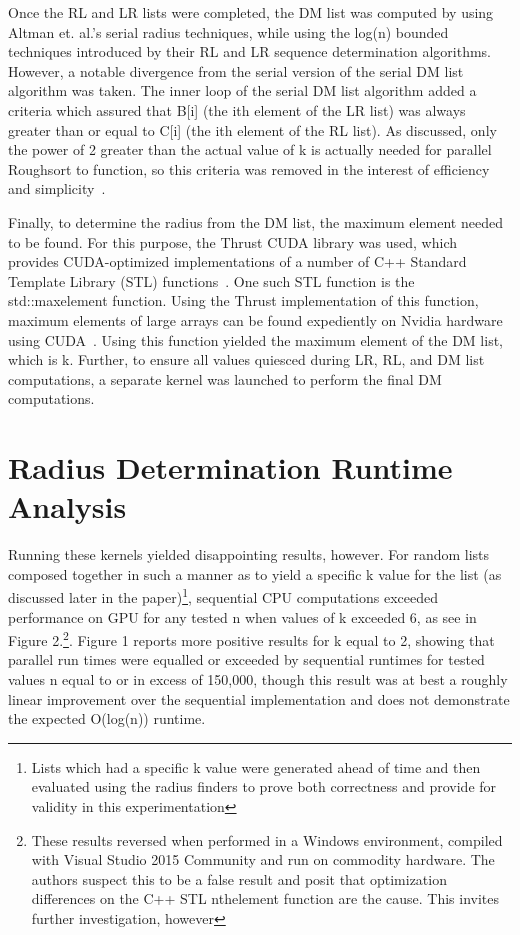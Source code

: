 \documentclass[letterpaper, 12pt]{article}
\let\supercite\cite
\renewcommand{\cite}[1]{\textnormal{~\supercite{#1}}}
\begin{document}
  Once the RL and LR lists were completed, the DM list was computed by using Altman et. al.\textquoteright s serial radius techniques, while using the log(n) bounded techniques introduced by their RL and LR sequence determination algorithms.  However, a notable divergence from the serial version of the serial DM list algorithm was taken.  The inner loop of the serial DM list algorithm added a criteria which assured that B[i] (the ith element of the LR list) was always greater than or equal to C[i] (the ith element of the RL list).  As discussed, only the power of 2 greater than the actual value of k is actually needed for parallel Roughsort to function, so this criteria was removed in the interest of efficiency and simplicity\cite{altman89}.

  Finally, to determine the radius from the DM list, the maximum element needed to be found.  For this purpose, the Thrust CUDA library was used, which provides CUDA-optimized implementations of a number of C++ Standard Template Library (STL) functions\cite{thrust}.  One such STL function is the std::max\textunderscore element function.  Using the Thrust implementation of this function, maximum elements of large arrays can be found expediently on Nvidia hardware using CUDA\cite{extrema}.  Using this function yielded the maximum element of the DM list, which is k.  Further, to ensure all values quiesced during LR, RL, and DM list computations, a separate kernel was launched to perform the final DM computations.

\section{Radius Determination Runtime Analysis}

  Running these kernels yielded disappointing results, however.  For random lists composed together in such a manner as to yield a specific k value for the list (as discussed later in the paper)\footnote{Lists which had a specific k value were generated ahead of time and then evaluated using the radius finders to prove both correctness and provide for validity in this experimentation}, sequential CPU computations exceeded performance on GPU for any tested n when values of k exceeded 6, as see in Figure 2.\footnote{These results reversed when performed in a Windows environment, compiled with Visual Studio 2015 Community and run on commodity hardware.  The authors suspect this to be a false result and posit that optimization differences on the C++ STL nth\textunderscore element function are the cause.  This invites further investigation, however}.  Figure 1 reports more positive results for k equal to 2, showing that parallel run times were equalled or exceeded by sequential runtimes for tested values n equal to or in excess of 150,000, though this result was at best a roughly linear improvement over the sequential implementation and does not demonstrate the expected O(log(n)) runtime.
\end{document}
